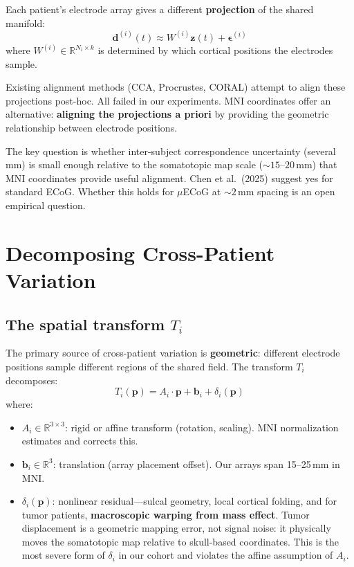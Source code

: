 \documentclass[11pt,letterpaper]{article}
\newcommand{\bfp}{\mathbf{p}}
\newcommand{\bfz}{\mathbf{z}}
\newcommand{\bfd}{\mathbf{d}}
\newcommand{\bfb}{\mathbf{b}}
\newcommand{\R}{\mathbb{R}}
\begin{document}
Each patient's electrode array gives a different \textbf{projection} of the shared manifold:
\begin{equation}\label{eq:projection}
\bfd^{(i)}(t) \approx W^{(i)} \bfz(t) + \boldsymbol{\epsilon}^{(i)}
\end{equation}
where $W^{(i)} \in \R^{N_i \times k}$ is determined by which cortical positions the electrodes sample.

Existing alignment methods (CCA, Procrustes, CORAL) attempt to align these projections post-hoc. All failed in our experiments. MNI coordinates offer an alternative: \textbf{aligning the projections a priori} by providing the geometric relationship between electrode positions.

The key question is whether inter-subject correspondence uncertainty (several mm) is small enough relative to the somatotopic map scale (${\sim}15$--$20$\,mm) that MNI coordinates provide useful alignment. Chen et al.\ (2025) suggest yes for standard ECoG. Whether this holds for $\mu$ECoG at ${\sim}2$\,mm spacing is an open empirical question.


\section{Decomposing Cross-Patient Variation}

\subsection{The spatial transform $T_i$}

The primary source of cross-patient variation is \textbf{geometric}: different electrode positions sample different regions of the shared field. The transform $T_i$ decomposes:
\begin{equation}\label{eq:transform}
T_i(\bfp) = A_i \cdot \bfp + \bfb_i + \delta_i(\bfp)
\end{equation}
where:
\begin{itemize}[leftmargin=2em]
\item $A_i \in \R^{3 \times 3}$: rigid or affine transform (rotation, scaling). MNI normalization estimates and corrects this.
\item $\bfb_i \in \R^3$: translation (array placement offset). Our arrays span 15--25\,mm in MNI.
\item $\delta_i(\bfp)$: nonlinear residual---sulcal geometry, local cortical folding, and for tumor patients, \textbf{macroscopic warping from mass effect}. Tumor displacement is a geometric mapping error, not signal noise: it physically moves the somatotopic map relative to skull-based coordinates. This is the most severe form of $\delta_i$ in our cohort and violates the affine assumption of $A_i$.
\end{itemize}
\end{document}

